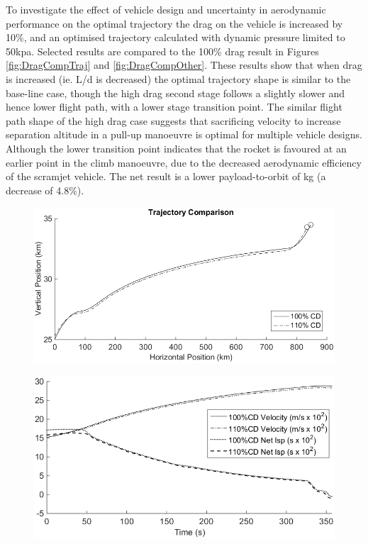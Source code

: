 To investigate the effect of vehicle design and uncertainty in aerodynamic performance on the optimal trajectory the drag on the vehicle is increased by 10\%, and an optimised trajectory calculated with dynamic pressure limited to 50kpa. Selected results are compared to the 100\% drag result in Figures \ref{fig:DragCompTraj} and \ref{fig:DragCompOther}. 
These results show that when drag is increased (ie. L/d is decreased) the optimal trajectory shape is similar to the base-line case, though the high drag second stage follows a slightly slower and hence lower flight path, with a lower stage transition point. The similar flight path shape of the high drag case suggests that sacrificing velocity to increase separation altitude in a pull-up manoeuvre is optimal for multiple vehicle designs. Although the lower transition point indicates that the rocket is favoured at an earlier point in the climb manoeuvre, due to the decreased aerodynamic efficiency of the scramjet vehicle. 
The net result is  a lower payload-to-orbit of \PayloadToOrbitHighDrag kg (a decrease of 4.8\%). 



\begin{figure}[ht]
\centering
\includegraphics[width=0.9\linewidth]{figures/5_Ascent/DragComparisonTraj}
\caption{}
\label{fig:DragComparisonTraj}
\end{figure}
\begin{figure}[ht]
\centering
\includegraphics[width=0.8\linewidth]{figures/5_Ascent/DragComparisonOther}
\caption{}
\label{fig:DragComparisonOther}
\end{figure}

